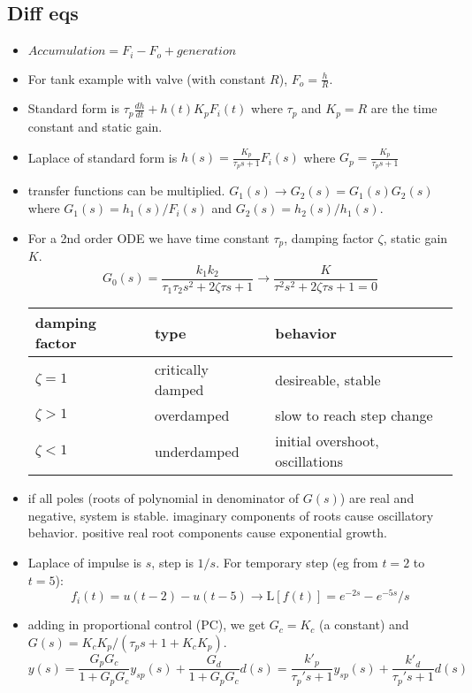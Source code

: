 \documentclass{article}
\begin{document}
\begin{multicols*}{2}
\section{Diff eqs}
\begin{itemize}
    \setlength\itemsep{0em}
    \item $Accumulation = F_i - F_o + generation$
    \item For tank example with valve (with constant $R$), $F_o = \frac{h}{R}$.
    \item Standard form is $\tau_p \frac{dh}{dt} + h(t) K_pF_i(t)$ where $\tau_p$ and $K_p = R$ are the time constant and static gain.
    \item Laplace of standard form is $h(s) = \frac{K_p}{\tau_ps+1}F_i(s)$ where $G_p = \frac{K_p}{\tau_ps+1}$
    \item transfer functions can be multiplied. $G_1(s) \rightarrow G_2(s) = G_1(s)G_2(s)$ where $G_1(s) = h_1(s)/F_i(s)$ and $G_2(s) = h_2(s)/h_1(s)$.
    \item For a 2nd order ODE we have time constant $\tau_p$, damping factor $\zeta$, static gain $K$.
        $$ G_0(s) = \frac{k_1k_2}{\tau_1\tau_2s^2+2\zeta\tau s + 1} \rightarrow \frac{K}{\tau^2s^2+2\zeta\tau s + 1 = 0} $$
        \def\arraystretch{1}
        \begin{tabular}{l l l}
        \textbf{damping factor} & \textbf{type} & \textbf{behavior} \\
            \hline
            $\zeta = 1$ & critically damped & desireable, stable\\
            $\zeta > 1$ & overdamped & slow to reach step change\\
            $\zeta < 1$ & underdamped & initial overshoot, oscillations\\
        \end{tabular}
    \item if all poles (roots of polynomial in denominator of $G(s)$) are real and negative, system is stable. imaginary components of roots cause oscillatory behavior. positive real root components cause exponential growth.
    \item Laplace of impulse is $s$, step is $1/s$. For temporary step (eg from $t=2$ to $t=5$):
        $$f_i(t) = u(t-2) - u(t-5) \rightarrow \mathrm{L}[f(t)]=e^{-2s}-e^{-5s}/s$$
    \item adding in proportional control (PC), we get $G_c = K_c$ (a constant) and $G(s) = K_cK_p / (\tau_ps+1+K_cK_p)$.
        $$ y(s) =  \frac{G_pG_c}{1 + G_pG_c} y_{sp}(s) + \frac{G_d}{1+G_pG_c}d(s) = \frac{k'_p}{\tau_p's+1}y_{sp}(s) + \frac{k'_d}{\tau_p's+1}d(s)$$

\end{itemize}
\end{multicols*}
\end{document}
